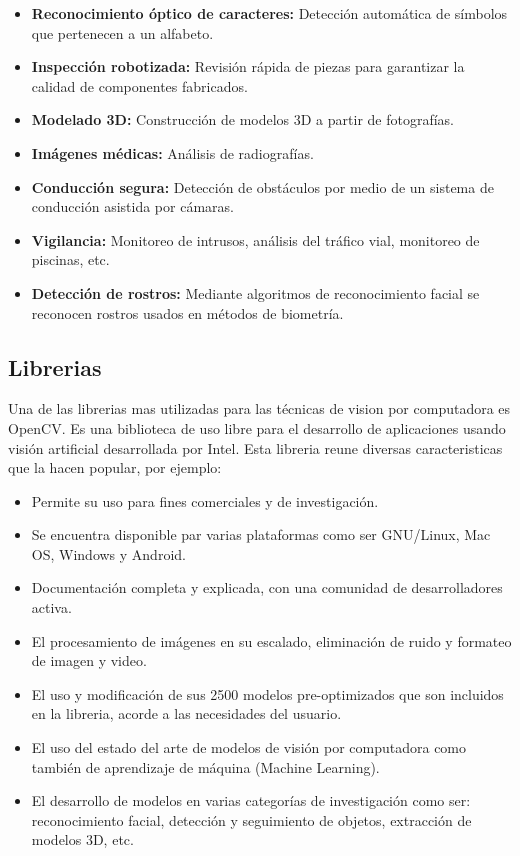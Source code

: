 \begin{itemize}
    \item \textbf{Reconocimiento óptico de caracteres:} Detección automática de símbolos que pertenecen a un alfabeto.
    \item \textbf{Inspección robotizada:} Revisión rápida de piezas para garantizar la calidad de componentes fabricados.
    \item \textbf{Modelado 3D:} Construcción de modelos 3D a partir de fotografías.
    \item \textbf{Imágenes médicas:} Análisis de radiografías.
    \item \textbf{Conducción segura:} Detección de obstáculos por medio de un sistema de conducción asistida por cámaras.
    \item \textbf{Vigilancia:} Monitoreo de intrusos, análisis del tráfico vial, monitoreo de piscinas, etc.
    \item \textbf{Detección de rostros:} Mediante algoritmos de reconocimiento facial se reconocen rostros usados en métodos de biometría.
\end{itemize}

\subsection{Librerias}
Una de las librerias mas utilizadas para las técnicas de vision por computadora es OpenCV. Es una biblioteca de uso libre para el desarrollo de aplicaciones usando visión artificial desarrollada por Intel. Esta libreria reune diversas caracteristicas que la hacen popular, por ejemplo: 
\begin{itemize}
    \item Permite su uso para fines comerciales y de investigación.
    \item Se encuentra disponible par varias plataformas como ser GNU/Linux, Mac OS, Windows y Android.
    \item Documentación completa y explicada, con una comunidad de desarrolladores activa.
    \item El procesamiento de imágenes en su escalado, eliminación de ruido y formateo de imagen y video.
    \item El uso y modificación de sus 2500 modelos pre-optimizados que son incluidos en la libreria, acorde a las necesidades del usuario.
    \item El uso del estado del arte de modelos de visión por computadora como también de aprendizaje de máquina (Machine Learning).
    \item El desarrollo de modelos en varias categorías de investigación como ser: reconocimiento facial, detección y seguimiento de objetos, extracción de modelos 3D, etc.
\end{itemize}

